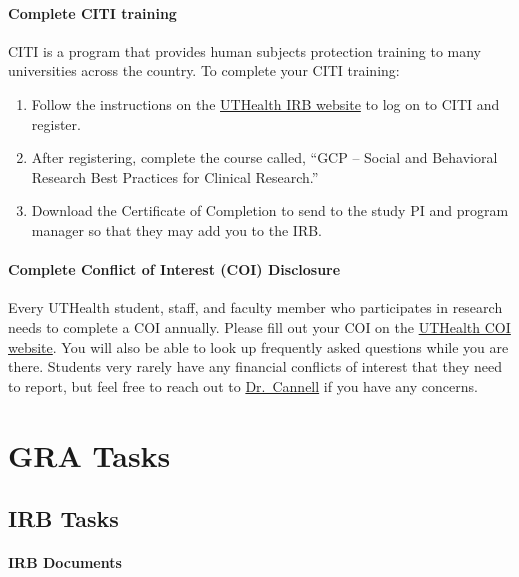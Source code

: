 \documentclass[
  letterpaper,
  DIV=11,
  numbers=noendperiod]{scrreprt}
\providecommand{\tightlist}{%
  \setlength{\itemsep}{0pt}\setlength{\parskip}{0pt}}\usepackage{longtable,booktabs,array}
\begin{document}
\subsection{Complete CITI training}\label{complete-citi-training}

CITI is a program that provides human subjects protection training to
many universities across the country. To complete your CITI training:

\begin{enumerate}
\def\labelenumi{\arabic{enumi}.}
\tightlist
\item
  Follow the instructions on the
  \href{https://www.uth.edu/cphs/for-researchers/training.htm\#CITI}{UTHealth
  IRB website} to log on to CITI and register.
\item
  After registering, complete the course called, ``GCP -- Social and
  Behavioral Research Best Practices for Clinical Research.''
\item
  Download the Certificate of Completion to send to the study PI and
  program manager so that they may add you to the IRB.
\end{enumerate}

\subsection{Complete Conflict of Interest (COI)
Disclosure}\label{complete-conflict-of-interest-coi-disclosure}

Every UTHealth student, staff, and faculty member who participates in
research needs to complete a COI annually. Please fill out your COI on
the \href{https://inside.uth.edu/coi/financial-disclosures.htm}{UTHealth
COI website}. You will also be able to look up frequently asked
questions while you are there. Students very rarely have any financial
conflicts of interest that they need to report, but feel free to reach
out to \href{mailto:Michael.B.Cannell@uth.tmc.edu}{Dr.~Cannell} if you
have any concerns.

\part{GRA Tasks}

\chapter{IRB Tasks}\label{sec-irb}

\subsection{IRB Documents}\label{irb-documents}
\end{document}

